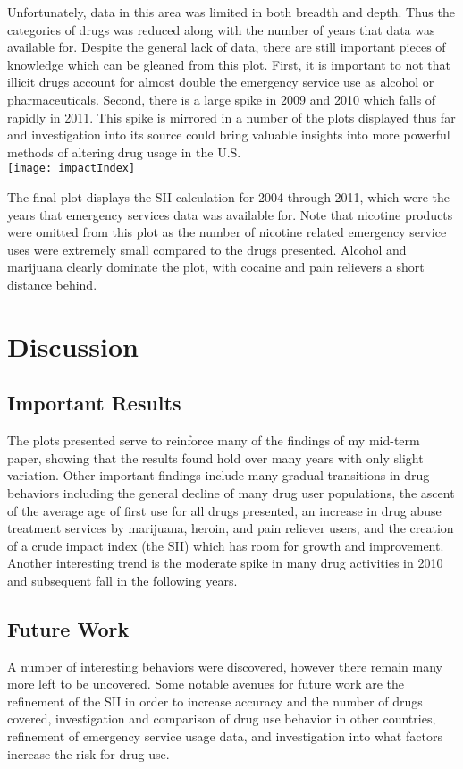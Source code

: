 \documentclass[a4 paper]{article}
\begin{document}
\noindent Unfortunately, data in this area was limited in both breadth and depth. Thus the categories of drugs was reduced along with the number of years that data was available for. Despite the general lack of data, there are still important pieces of knowledge which can be gleaned from this plot. First, it is important to not that illicit drugs account for almost double the emergency service use as alcohol or pharmaceuticals. Second, there is a large spike  in 2009 and 2010 which falls of rapidly in 2011. This spike is mirrored in a number of the plots displayed thus far and investigation into its source could bring valuable insights into more powerful methods of altering drug usage in the U.S.\\

\noindent\texttt{[image: impactIndex]}

\noindent The final plot displays the SII calculation for 2004 through 2011, which were the years that emergency services data was available for. Note that nicotine products were omitted from this plot as the number of nicotine related emergency service uses were extremely small compared to the drugs presented. Alcohol and marijuana clearly dominate the plot, with cocaine and pain relievers a short distance behind. 

\section*{Discussion}
\subsection*{Important Results}
\noindent The plots presented serve to reinforce many of the findings of my mid-term paper, showing that the results found hold over many years with only slight variation. Other important findings include many gradual transitions in drug behaviors including the general decline of many drug user populations, the ascent of the average age of first use for all drugs presented, an increase in drug abuse treatment services by marijuana, heroin, and pain reliever users, and the creation of a crude impact index (the SII) which has room for growth and improvement. Another interesting trend is the moderate spike in many drug activities in 2010 and subsequent fall in the following years.

\subsection*{Future Work}
\noindent A number of interesting behaviors were discovered, however there remain many more left to be uncovered. Some notable avenues for future work are the refinement of the SII in order to increase accuracy and the number of drugs covered, investigation and comparison of drug use behavior in other countries, refinement of emergency service usage data, and investigation into what factors increase the risk for drug use.
\end{document}
